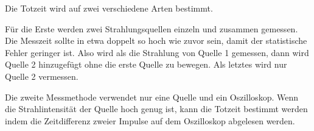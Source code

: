 Die Totzeit wird auf zwei verschiedene Arten bestimmt.

Für die Erste werden zwei Strahlungsquellen einzeln und zusammen gemessen.
Die Messzeit sollte in etwa doppelt so hoch wie zuvor sein, damit der statistische Fehler geringer ist.
Also wird als die Strahlung von Quelle 1 gemessen, dann wird Quelle 2 hinzugefügt ohne die erste Quelle zu bewegen.
Als letztes wird nur Quelle 2 vermessen.

Die zweite Messmethode verwendet nur eine Quelle und ein Oszilloskop.
Wenn die Strahlintensität der Quelle hoch genug ist, kann die Totzeit bestimmt werden indem die Zeitdifferenz zweier Impulse auf dem Oszilloskop abgelesen werden.